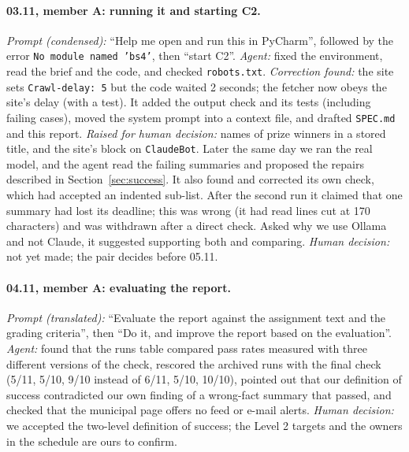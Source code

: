 \documentclass{article}
\begin{document}
\paragraph{03.11, member A: running it and starting C2.} \emph{Prompt (condensed):} ``Help me open and run
this in PyCharm'', followed by the error \texttt{No module named 'bs4'}, then ``start C2''.
\emph{Agent:} fixed the environment, read the brief and the code, and checked
\texttt{robots.txt}. \emph{Correction found:} the site sets \texttt{Crawl-delay: 5} but the code
waited 2 seconds; the fetcher now obeys the site's delay (with a test). It added the output check
and its tests (including failing cases), moved the system prompt into a context file, and drafted
\texttt{SPEC.md} and this report. \emph{Raised for human decision:} names of prize winners in a
stored title, and the site's block on \texttt{ClaudeBot}. Later the same day we ran the real model, and the agent read the failing summaries and
proposed the repairs described in Section~\ref{sec:success}. It also found and corrected its own
check, which had accepted an indented sub-list. After the second run it claimed that one summary had lost its
deadline; this was wrong (it had read lines cut at 170 characters) and was withdrawn after a
direct check. Asked why we use Ollama and not Claude, it suggested supporting both and comparing. \emph{Human decision:} not yet made; the pair
decides before 05.11.

\paragraph{04.11, member A: evaluating the report.} \emph{Prompt (translated):} ``Evaluate the report against
the assignment text and the grading criteria'', then ``Do it, and improve the report based on the
evaluation''. \emph{Agent:} found that the runs table compared pass rates measured with three different
versions of the check, rescored the archived runs with the final check (5/11, 5/10, 9/10 instead of 6/11,
5/10, 10/10), pointed out that our definition of success contradicted our own finding of a wrong-fact
summary that passed, and checked that the municipal page offers no feed or e-mail alerts.
\emph{Human decision:} we accepted the two-level definition of success; the Level 2 targets and the
owners in the schedule are ours to confirm.
\end{document}
